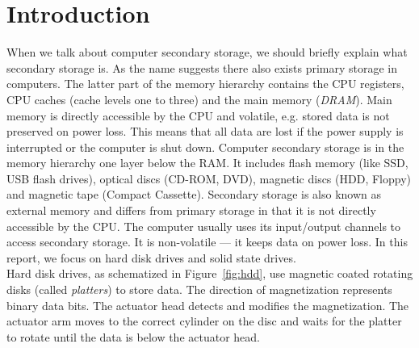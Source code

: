 \documentclass{acm_proc_article-sp}
\begin{document}
\section{Introduction}
When we talk about computer secondary storage, we should briefly explain what secondary storage is. As the name suggests there also exists primary storage in computers. The latter part of the memory hierarchy contains the CPU registers, CPU caches (cache levels one to three) and the main memory (\emph{DRAM}). Main memory is directly accessible by the CPU and volatile, e.g. stored data is not preserved on power loss. This means that all data are lost if the power supply is interrupted or the computer is shut down. Computer secondary storage is in the memory hierarchy one layer below the RAM. It includes flash memory (like SSD, USB flash drives), optical discs (CD-ROM, DVD), magnetic discs (HDD, Floppy) and magnetic tape (Compact Cassette). Secondary storage is also known as external memory and differs from primary storage in that it is not directly accessible by the CPU. The computer usually uses its input/output channels to access secondary storage. It is non-volatile --- it keeps data on power loss. In this report, we focus on hard disk drives and solid state drives.
\\
Hard disk drives, as schematized in Figure~\ref{fig:hdd}, use magnetic coated rotating disks (called \emph{platters}) to store data. The direction of magnetization represents binary data bits. The actuator head detects and modifies the magnetization. The actuator arm moves to the correct cylinder on the disc and waits for the platter to rotate until the data is below the actuator head.
\end{document}
